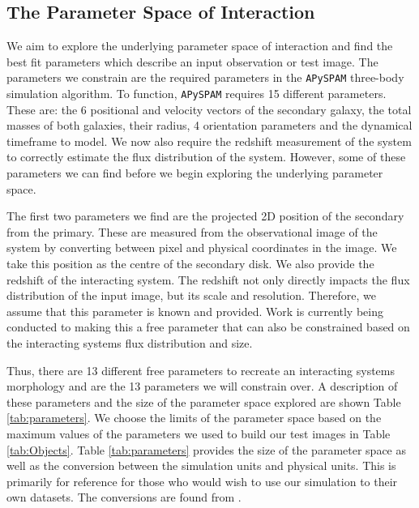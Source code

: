 \subsection{The Parameter Space of Interaction}
We aim to explore the underlying parameter space of interaction and find the best fit parameters which describe an input observation or test image. The parameters we constrain are the required parameters in the \texttt{APySPAM} three-body simulation algorithm. To function, \texttt{APySPAM} requires 15 different parameters. These are: the 6 positional and velocity vectors of the secondary galaxy, the total masses of both galaxies, their radius, 4 orientation parameters and the dynamical timeframe to model. We now also require the redshift measurement of the system to correctly estimate the flux distribution of the system. However, some of these parameters we can find before we begin exploring the underlying parameter space.

The first two parameters we find are the projected 2D position of the secondary from the primary. These are measured from the observational image of the system by converting between pixel and physical coordinates in the image. We take this position as the centre of the secondary disk. We also provide the redshift of the interacting system. The redshift not only directly impacts the flux distribution of the input image, but its scale and resolution. Therefore, we assume that this parameter is known and provided. Work is currently being conducted to making this a free parameter that can also be constrained based on the interacting systems flux distribution and size.

Thus, there are 13 different free parameters to recreate an interacting systems morphology and are the 13 parameters we will constrain over. A description of these parameters and the size of the parameter space explored are shown Table \ref{tab:parameters}. We choose the limits of the parameter space based on the maximum values of the parameters we used to build our test images in Table \ref{tab:Objects}. Table \ref{tab:parameters} provides the size of the parameter space as well as the conversion between the simulation units and physical units. This is primarily for reference for those who would wish to use our simulation to their own datasets. The conversions are found from \citet{1990AJ....100.1477W}.

